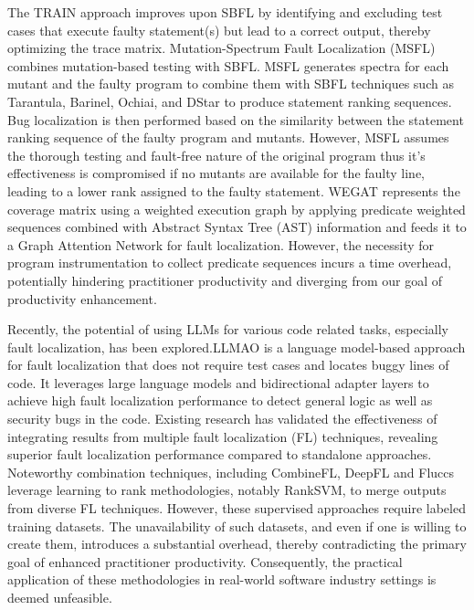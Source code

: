 \documentclass[sigconf]{acmart}
\begin{document}
	The TRAIN \cite{HU2024111900} approach improves upon SBFL by identifying and excluding test cases that execute faulty statement(s) but lead to a correct output, thereby optimizing the trace matrix. Mutation-Spectrum Fault Localization \cite{dutta2021msfl} (MSFL) \cite{dutta2021msfl} combines mutation-based testing with SBFL. MSFL generates spectra for each mutant and the faulty program to combine them with SBFL techniques such as Tarantula, Barinel, Ochiai, and DStar to produce statement ranking sequences. Bug localization is then performed based on the similarity between the statement ranking sequence of the faulty program and mutants. However, MSFL assumes the thorough testing and fault-free nature of the original program thus it's effectiveness is compromised if no mutants are available for the faulty line, leading to a lower rank assigned to the faulty statement. WEGAT \cite{yanimproving}  represents the coverage matrix using a weighted execution graph by applying predicate weighted sequences combined with Abstract Syntax Tree (AST) information and feeds it to a Graph Attention Network for fault localization. However, the necessity for program instrumentation to collect predicate sequences incurs a time overhead, potentially hindering practitioner productivity and diverging from our goal of productivity enhancement.
	
	Recently, the potential of using LLMs for various code related tasks, especially fault localization, has been explored.LLMAO \cite{adian2023LLMAO} is a language model-based approach for fault localization that does not require test cases and locates buggy lines of code. It leverages large language models and bidirectional adapter layers to achieve high fault localization performance to detect general logic as well as security bugs in the code.
	Existing research has validated the effectiveness of integrating results from multiple fault localization (FL) techniques, revealing superior fault localization performance compared to standalone approaches. Noteworthy combination techniques, including CombineFL\cite{zou2019empirical}, DeepFL\cite{li2019deepfl} and Fluccs\cite{sohn2017fluccs} leverage learning to rank methodologies, notably RankSVM, to merge outputs from diverse FL techniques. However, these supervised approaches require labeled training datasets. The unavailability of such datasets, and even if one is willing to create them, introduces a substantial overhead, thereby contradicting the primary goal of enhanced practitioner productivity. Consequently, the practical application of these methodologies in real-world software industry settings is deemed unfeasible.
\end{document}
